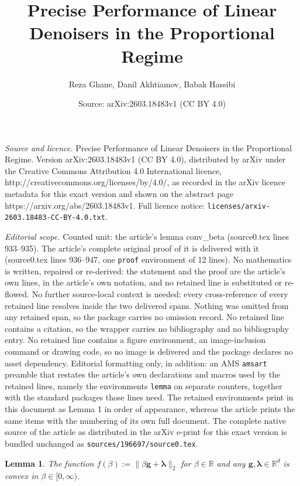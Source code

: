 \documentclass[10pt,a4paper]{amsart}
\title{Precise Performance of Linear Denoisers in the Proportional Regime}
\author{Reza Ghane, Danil Akhtiamov, Babak Hassibi}
\date{Source: arXiv:2603.18483v1 (CC BY 4.0)}
\newtheorem{lemma}{Lemma}
\newcommand{\bbR}{\mathbb{R}}
\newcommand{\bg}{\mathbf{g}}
\newcommand{\blambda}{\bm{\lambda}}
\begin{document}
\maketitle

\noindent\emph{Source and licence.} Precise Performance of Linear Denoisers in the Proportional Regime. Version arXiv:2603.18483v1 (CC BY 4.0), distributed by arXiv under the Creative Commons Attribution 4.0 International licence, http://creativecommons.org/licenses/by/4.0/, as recorded in the arXiv licence metadata for this exact version and shown on the abstract page https://arxiv.org/abs/2603.18483v1. Full licence notice: \texttt{licenses/arxiv-2603.18483-CC-BY-4.0.txt}.\par\smallskip

\noindent\textit{Editorial scope.} Counted unit: the article's lemma conv\_beta (source0.tex lines 933--935). The article's complete original proof of it is delivered with it (source0.tex lines 936--947, one \texttt{proof} environment of 12 lines). No mathematics is written, repaired or re-derived: the statement and the proof are the article's own lines, in the article's own notation, and no retained line is substituted or re-flowed.  No further source-local context is needed: every cross-reference of every retained line resolves inside the two delivered spans.  Nothing was omitted from any retained span, so the package carries no omission record.  No retained line contains a citation, so the wrapper carries no bibliography and no bibliography entry.  No retained line contains a figure environment, an image-inclusion command or drawing code, so no image is delivered and the package declares no asset dependency.  Editorial formatting only, in addition: an AMS \texttt{amsart} preamble that restates the article's own declarations and macros used by the retained lines, namely the environments \texttt{lemma} on separate counters, together with the standard packages those lines need.  The retained environments print in this document as Lemma 1 in order of appearance, whereas the article prints the same items with the numbering of its own full document.  The complete native source of the article as distributed in the arXiv e-print for this exact version is bundled unchanged as \texttt{sources/196697/source0.tex}.
\begin{lemma}\label{lem: conv_beta}
    The function $f(\beta):= \|\beta \bg + \blambda\|_2$ for $\beta \in \bbR$ and any $\bg, \blambda \in \bbR^{d}$ is convex in $\beta \in [0, \infty)$.
\end{lemma}
\end{document}

